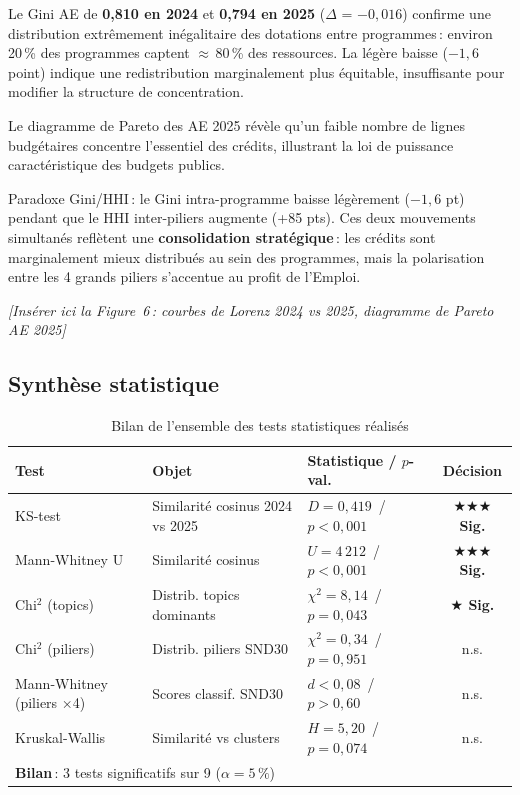 \documentclass[12pt, a4paper]{article}
\newcommand{\sig}[1]{\textcolor{rougeCMR}{\textbf{#1}}}
\newcommand{\figref}[1]{\textcolor{bleuCMR}{\textit{[#1]}}}
\begin{document}
Le Gini AE de \textbf{0,810 en 2024} et \textbf{0,794 en 2025} ($\Delta$ = $-0{,}016$) confirme une 
distribution extrêmement inégalitaire des dotations entre programmes\,: environ 20\,\% des programmes 
captent $\approx$\,80\,\% des ressources. La légère baisse ($-1{,}6$ point) indique une redistribution 
marginalement plus équitable, insuffisante pour modifier la structure de concentration.

Le diagramme de Pareto des AE 2025 révèle qu'un faible nombre de lignes budgétaires concentre 
l'essentiel des crédits, illustrant la loi de puissance caractéristique des budgets publics.

\begin{keybox}
\small Paradoxe Gini/HHI\,: le Gini intra-programme baisse légèrement ($-1{,}6$ pt) pendant que le HHI 
inter-piliers augmente (+85 pts). Ces deux mouvements simultanés reflètent une \textbf{consolidation 
stratégique}\,: les crédits sont marginalement mieux distribués au sein des programmes, mais la 
polarisation entre les 4 grands piliers s'accentue au profit de l'Emploi.
\end{keybox}

\figref{Insérer ici la Figure~6\,: courbes de Lorenz 2024 vs 2025, diagramme de Pareto AE 2025}

\subsection{Synthèse statistique}

\begin{table}[H]
\centering
\caption{Bilan de l'ensemble des tests statistiques réalisés}
\label{tab:bilan}
\small
\begin{tabularx}{\linewidth}{lXXc}
\toprule
\rowcolor{bleuCMR!15}
\textbf{Test} & \textbf{Objet} & \textbf{Statistique / $p$-val.} & \textbf{Décision} \\
\midrule
KS-test & Similarité cosinus 2024 vs 2025 & $D=0{,}419$ \,/\, $p<0{,}001$ & \sig{$\bigstar\bigstar\bigstar$ Sig.} \\
Mann-Whitney U & Similarité cosinus & $U=4\,212$ \,/\, $p<0{,}001$ & \sig{$\bigstar\bigstar\bigstar$ Sig.} \\
Chi$^2$ (topics) & Distrib. topics dominants & $\chi^2=8{,}14$ \,/\, $p=0{,}043$ & \sig{$\bigstar$ Sig.} \\
Chi$^2$ (piliers) & Distrib. piliers SND30 & $\chi^2=0{,}34$ \,/\, $p=0{,}951$ & n.s. \\
Mann-Whitney (piliers ×4) & Scores classif. SND30 & $d<0{,}08$ \,/\, $p>0{,}60$ & n.s. \\
Kruskal-Wallis & Similarité vs clusters & $H=5{,}20$ \,/\, $p=0{,}074$ & n.s. \\
\midrule
\multicolumn{3}{l}{\textbf{Bilan}\,: 3 tests significatifs sur 9 ($\alpha=5\,\%$)} & \\
\bottomrule
\end{tabularx}
\end{table}
\end{document}
